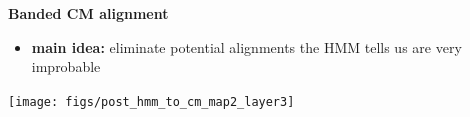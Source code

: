 \documentclass[landscape]{slides}
\begin{document}
\begin{slide}
\begin{center}
\large
\textbf{Banded CM alignment}
\end{center}
\medskip
\small
\begin{itemize}
\item
\textbf{main idea:} eliminate potential alignments the HMM tells us are very improbable
\end{itemize}
\begin{center}
\texttt{[image: figs/post\_hmm\_to\_cm\_map2\_layer3]}
\end{center}
\vfill
\end{slide}
\end{document}
